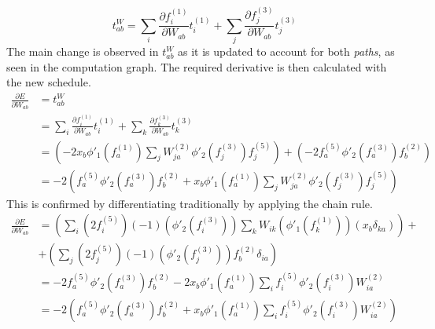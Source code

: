 \documentclass[fleqn]{article}
\begin{document}
\begin{equation}
    t^{W}_{ab} = \sum_i \frac{\partial f^{(1)}_i}{\partial W_{ab}} t^{(1)}_i + \sum_j \frac{\partial f^{(3)}_j}{\partial W_{ab}} t^{(3)}_j
\end{equation}
The main change is observed in $t^{W}_{ab}$ as it is updated to account for both \textit{paths}, as seen in the computation graph. The required derivative is then calculated with the new schedule.
\begin{equation}
    \begin{split}
        \frac{\partial E}{\partial W_{ab}} & = t^{W}_{ab} \\
        & = \sum_i \frac{\partial f^{(1)}_i}{\partial W_{ab}} t^{(1)}_i + \sum_k \frac{\partial f^{(3)}_k}{\partial W_{ab}} t^{(3)}_k \\
        & =
        \left( - 2 x_b \phi'_1 \left ( f^{(1)}_a \right ) \sum_j W^{(2)}_{ja} \phi'_2 \left ( f^{(3)}_j \right ) f^{(5)}_j \right) +
        \left( - 2 f^{(5)}_a \phi'_2 \left ( f^{(3)}_a \right ) f^{(2)}_b \right) \\
        & = -2 \left (f^{(5)}_a \phi'_2\left(f^{(3)}_a \right ) f^{(2)}_b + x_b \phi'_1 \left ( f^{(1)}_a \right ) \sum_j W^{(2)}_{ja} \phi'_2 \left ( f^{(3)}_j \right ) f^{(5)}_j \right )
    \end{split}
\end{equation}
This is confirmed by differentiating traditionally by applying the chain rule.
\begin{equation}
    \begin{split}
        \frac{\partial E}{\partial W_{ab}} & =
        \left ( \sum_i \left ( 2 f^{(5)}_i \right ) \left ( -1 \right ) \left ( \phi'_2 \left ( f^{(3)}_i \right ) \right ) \sum_k W_{ik} \left ( \phi'_1 \left ( f^{(1)}_k \right ) \right ) \left ( x_b \delta_{ka} \right ) \right ) + \\
        & + \left ( \sum_j \left ( 2 f^{(5)}_j \right ) \left ( -1 \right ) \left ( \phi'_2 \left ( f^{(3)}_j \right ) \right ) f^{(2)}_b \delta_{ia} \right ) \\
        & = - 2 f^{(5)}_a \phi'_2 \left ( f^{(3)}_a \right ) f^{(2)}_b - 2 x_b \phi'_1 \left (f^{(1)}_a \right ) \sum_i f^{(5)}_i \phi'_2 \left ( f^{(3)}_i \right ) W^{(2)}_{ia} \\
        & = - 2 \left ( f^{(5)}_a \phi'_2 \left ( f^{(3)}_a \right ) f^{(2)}_b + x_b \phi'_1 \left (f^{(1)}_a \right ) \sum_i f^{(5)}_i \phi'_2 \left ( f^{(3)}_i \right ) W^{(2)}_{ia} \right )
    \end{split}
\end{equation}
\end{document}
